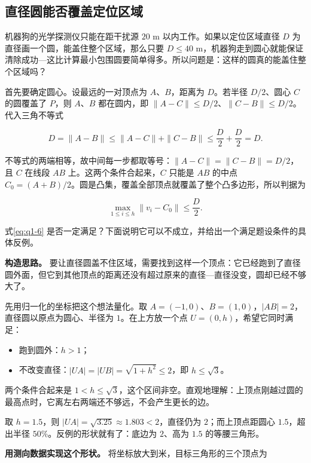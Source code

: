 \subsection{直径圆能否覆盖定位区域}\label{sec:q1-3}

机器狗的光学探测仪只能在距干扰源 $20$ m 以内工作。如果以定位区域直径 $D$ 为直径画一个圆，能盖住整个区域，那么只要 $D\le40$ m，机器狗走到圆心就能保证清除成功---这比计算最小包围圆要简单得多。所以问题是：这样的圆真的能盖住整个区域吗？

首先要确定圆心。设最远的一对顶点为 $A$、$B$，距离为 $D$。若半径 $D/2$、圆心 $C$ 的圆覆盖了 $P$，则 $A$、$B$ 都在圆内，即 $\|A-C\|\le D/2$、$\|C-B\|\le D/2$。代入三角不等式

\[
D=\|A-B\|\le\|A-C\|+\|C-B\|\le\frac D2+\frac D2=D .
\]

不等式的两端相等，故中间每一步都取等号：$\|A-C\|=\|C-B\|=D/2$，且 $C$ 在线段 $AB$ 上。这两个条件合起来，$C$ 只能是 $AB$ 的中点 $C_0=(A+B)/2$。圆是凸集，覆盖全部顶点就覆盖了整个凸多边形，所以判据为

\begin{equation}\label{eq:q1-6}
\max_{1\le i\le h}\|v_i-C_0\|\le\frac D2 .
\end{equation}

式\eqref{eq:q1-6} 是否一定满足？下面说明它可以不成立，并给出一个满足题设条件的具体反例。

\textbf{构造思路。} 要让直径圆盖不住区域，需要找到这样一个顶点：它已经跑到了直径圆外面，但它到其他顶点的距离还没有超过原来的直径---直径没变，圆却已经不够大了。

先用归一化的坐标把这个想法量化。取 $A=(-1,0)$、$B=(1,0)$，$|AB|=2$，直径圆以原点为圆心、半径为 $1$。在上方放一个点 $U=(0,h)$，希望它同时满足：

\begin{itemize}
\item 跑到圆外：$h>1$；
\item 不改变直径：$|UA|=|UB|=\sqrt{1+h^2}\le2$，即 $h\le\sqrt{3}$。
\end{itemize}

两个条件合起来是 $1<h\le\sqrt{3}$，这个区间非空。直观地理解：上顶点刚越过圆的最高点时，它离左右两端还不够远，不会产生更长的边。

取 $h=1.5$，则 $|UA|=\sqrt{3.25}\approx1.803<2$，直径仍为 $2$；而上顶点距圆心 $1.5$，超出半径 $50\%$。反例的形状就有了：底边为 $2$、高为 $1.5$ 的等腰三角形。

\textbf{用测向数据实现这个形状。} 将坐标放大到米，目标三角形的三个顶点为

